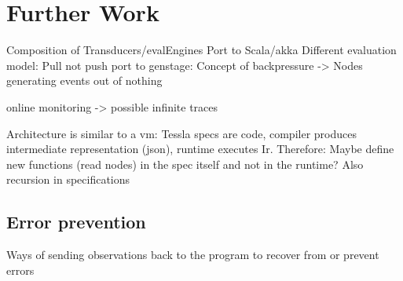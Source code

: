 \section{Further Work}
\label{sec:conclusion:further_work}

Composition of Transducers/evalEngines
Port to Scala/akka
Different evaluation model: Pull not push
  port to genstage: Concept of backpressure -> Nodes generating events out of nothing


online monitoring -> possible infinite traces

Architecture is similar to a vm: Tessla specs are code, compiler produces intermediate representation (json), runtime executes Ir.
Therefore: Maybe define new functions (read nodes) in the spec itself and not in the runtime? Also recursion in specifications

\subsection{Error prevention}
\label{sec:conclusion:further_work:error_prevention}
Ways of sending observations back to the program to recover from or prevent errors

